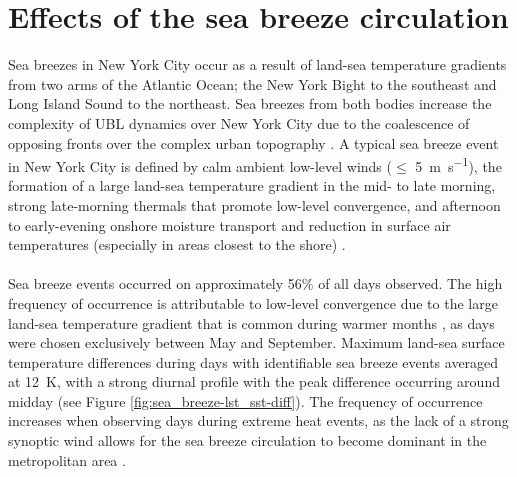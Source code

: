 \documentclass[11pt,a4paper]{article}
\begin{document}

\section{Effects of the sea breeze circulation} \label{section:sea_breeze_effects} 
Sea breezes in New York City occur as a result of land-sea temperature gradients from two arms of the Atlantic Ocean; the New York Bight to the southeast and Long Island Sound to the northeast. Sea breezes from both bodies increase the complexity of UBL dynamics over New York City due to the coalescence of opposing fronts over the complex urban topography \citep{bornstein1981}. A typical sea breeze event in New York City is defined by calm ambient low-level winds ($\leq$ \SI{5}{\meter\per\second}), the formation of a large land-sea temperature gradient in the mid- to late morning, strong late-morning thermals that promote low-level convergence, and afternoon to early-evening onshore moisture transport and reduction in surface air temperatures (especially in areas closest to the shore) \citep{childs2005, frizzola1963, gedzelman2003}. 
\\ \\
Sea breeze events occurred on approximately 56\% of all days observed. The high frequency of occurrence is  attributable to low-level convergence due to  the large land-sea temperature gradient that is common during warmer months \citep{childs2005, gedzelman2003, thompson2007}, as days were chosen exclusively between May and September. Maximum land-sea surface temperature differences during days with identifiable sea breeze events averaged at \SI{12}{\kelvin}, with a strong diurnal profile with the peak difference occurring around midday (see Figure \ref{fig:sea_breeze-lst_sst-diff}). The frequency of occurrence increases when observing days during extreme heat events, as the lack of a strong synoptic wind allows for the sea breeze circulation to become dominant in the metropolitan area \citep{miller2003}. 
\end{document}
